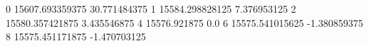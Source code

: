 0 15607.693359375 30.771484375
1 15584.298828125 7.376953125
2 15580.357421875 3.435546875
4 15576.921875 0.0
6 15575.541015625 -1.380859375
8 15575.451171875 -1.470703125
